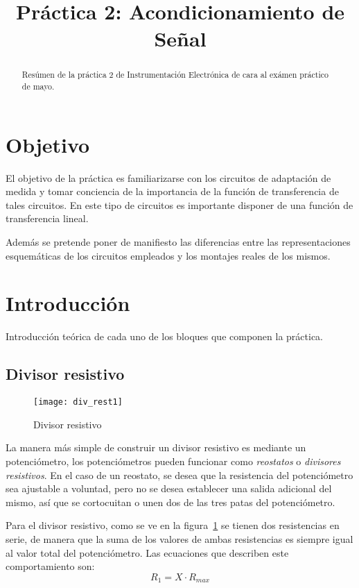 \documentclass [twocolumn, a4paper] {article}
\title{Práctica 2: Acondicionamiento de Señal}
\author{}
\date{}
\begin{document}
\maketitle
\tableofcontents
\listoffigures
\listoftables

\begin{abstract}
Resúmen de la práctica 2 de Instrumentación Electrónica de cara al exámen práctico de mayo.
\end{abstract}

\section{Objetivo}
El objetivo de la práctica es familiarizarse con los circuitos de adaptación de medida y tomar conciencia de la importancia de la función de transferencia de tales circuitos. En este tipo de circuitos es importante disponer de una función de transferencia lineal.

Además se pretende poner de manifiesto las diferencias entre las representaciones esquemáticas de los circuitos empleados y los montajes reales de los mismos.
\section{Introducción}
Introducción teórica de cada uno de los bloques que componen la práctica.
\subsection{Divisor resistivo}
  \begin{figure}
 		 \centering
   			 \texttt{[image: div\_rest1]}
 		 \caption{Divisor resistivo}
  		\label{fig:divisor}
	\end{figure}
La manera más simple de construir un divisor resistivo es mediante un potenciómetro, los potenciómetros pueden funcionar como \emph{reostatos} o \emph{divisores resistivos}. En el caso de un reostato, se desea que la resistencia del potenciómetro sea ajustable a voluntad, pero no se desea establecer una salida adicional del mismo, así que se cortocuitan o unen dos de las tres patas del potenciómetro.

Para el divisor resistivo, como se ve en la figura~\ref{fig:divisor} se tienen dos resistencias en serie, de manera que la suma de los valores de ambas resistencias es siempre igual al valor total del potenciómetro. Las ecuaciones que describen este comportamiento son:
	\begin{equation} 
		\label{eq:div_res}
			R_{1}=X \cdot R_{max}
	\end{equation}
\end{document}
